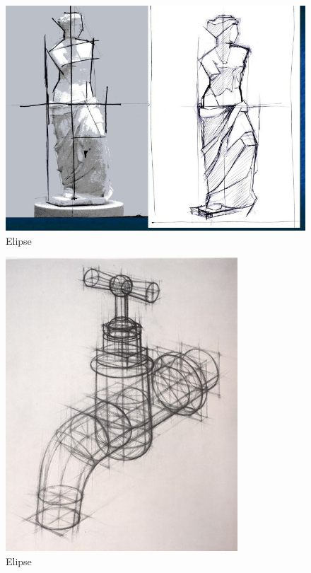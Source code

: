 \documentclass[16pt,]{krantz}
\theoremstyle{definition}
\theoremstyle{definition}
\theoremstyle{definition}
\theoremstyle{definition}
\theoremstyle{remark}
\begin{document}
\begin{figure}[!ht]

{\centering \includegraphics{pol1} 

}

\caption{Elipse}\label{fig:geometrizacion-3}
\end{figure}
\begin{figure}[!ht]

{\centering \includegraphics{pol2} 

}

\caption{Elipse}\label{fig:geometrizacion-4}
\end{figure}
\end{document}
